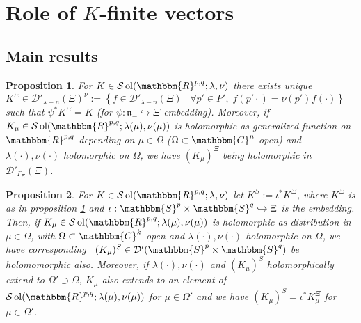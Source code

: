 \documentclass{article}
\newcommand{\assign}{:=}
\newcommand{\comma}{{,}}
\newcommand{\tmop}[1]{\ensuremath{\operatorname{#1}}}
\newtheorem{proposition}{Proposition}
{\theorembodyfont{\rmfamily}\newtheorem{remark}{Remark}}
\begin{document}
\

\

\

\

\

\

\

\

\

\

\

\

\

\

\

\

\section{Role of $K$-finite vectors}\label{sec:k-finite}

\subsection{Main results}

\begin{proposition}
  \label{k-finite:prop-claim2}For $K \in \mathcal{S} \tmop{ol}
  (\mathbbm{R}^{p, q} ; \lambda, \nu)$ there exists unique $K^{\Xi} \in
  \mathcal{D}'_{\lambda - n} (\Xi)^{\nu} \assign \left\{ f \in
  \mathcal{D}'_{\lambda - n} (\Xi) \middle| \forall p' \in P', \; f (p' \cdot)
  = \nu (p')^{} f (\cdot) \right\}$ such that $\psi^{\ast} K^{\Xi} = K$ (for
  $\psi : \mathfrak{n}_- \hookrightarrow \Xi$ embedding). Moreover, if
  $K_{\mu} \in \mathcal{S} \tmop{ol} (\mathbbm{R}^{p, q} ; \lambda (\mu), \nu
  (\mu))$ is holomorphic as generalized function on $\mathbbm{R}^{p, q}$
  depending on $\mu \in \Omega$ ($\Omega \subset \mathbbm{C}^n$ open) and
  $\lambda (\cdot), \nu (\cdot)$ holomorphic on $\Omega$, we have
  $(K_{\mu})^{\Xi}$ being holomorphic in $\mathcal{D}'_{\Gamma_{\Xi}} (\Xi)$.
\end{proposition}

\begin{proposition}
  \label{k-finite:prop-holo-to-holo}For $K \in \mathcal{S} \tmop{ol}
  (\mathbbm{R}^{p, q} ; \lambda, \nu)$ let $K^S \assign \iota^{\ast} K^{\Xi}$,
  where $K^{\Xi}$ is as in proposition \ref{k-finite:prop-claim2} and $\iota :
  \mathbbm{S}^p \times \mathbbm{S}^q \hookrightarrow \Xi$ is the embedding.
  Then, if $K_{\mu} \in \mathcal{S} \tmop{ol} (\mathbbm{R}^{p, q} ; \lambda
  (\mu), \nu (\mu))$ is holomorphic as distribution in $\mu \in \Omega$, with
  $\Omega \subset \mathbbm{C}^k$ open and $\lambda (\cdot) \comma \nu (\cdot)$
  holomorphic on $\Omega$, we have corresponding \ $(K_{\mu})^S \in
  \mathcal{D}' (\mathbbm{S}^p \times \mathbbm{S}^q)$ be holomomorphic also.
  Moreover, if $\lambda (\cdot), \nu (\cdot)$ and $(K_{\mu})^S$
  holomorphically extend to $\Omega' \supset \Omega$, $K_{\mu}$ also extends
  to an element of $\mathcal{S} \tmop{ol} (\mathbbm{R}^{p, q} ; \lambda (\mu),
  \nu (\mu))$ for $\mu \in \Omega'$ and we have $(K_{\mu})^S = \iota^{\ast}
  K_{\mu}^{\Xi}$ for $\mu \in \Omega'$.
\end{proposition}
\end{document}
